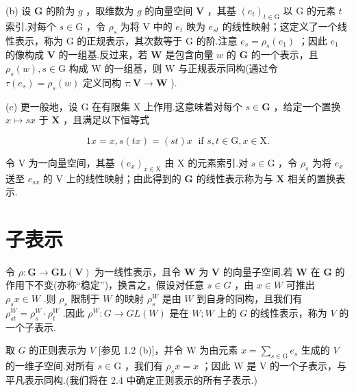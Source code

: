 (b) 设 \(\mathbf{G}\) 的阶为 \(g\) ，取维数为 \(g\) 的向量空间 \(\mathbf{V}\) ，其基 \({\left( {e}_{t}\right) }_{t \in  \mathrm{G}}\) 以 \(\mathrm{G}\) 的元素 \(t\) 索引.对每个 \(s \in  \mathrm{G}\) ，令 \({\rho }_{s}\) 为将 \(\mathrm{V}\) 中的 \({e}_{t}\) 映为 \({e}_{st}\) 的线性映射；这定义了一个线性表示，称为 G 的正规表示，其次数等于 G 的阶.注意 \({e}_{s} = {\rho }_{s}\left( {e}_{1}\right)\) ；因此 \({e}_{1}\) 的像构成 \(\mathbf{V}\) 的一组基.反过来，若 \(\mathbf{W}\) 是包含向量 \(w\) 的 \(\mathbf{G}\) 的一个表示，且 \({\rho }_{s}\left( w\right) ,s \in  \mathrm{G}\) 构成 \(\mathrm{W}\) 的一组基，则 W 与正规表示同构(通过令 \(\tau \left( {e}_{s}\right)  = {\rho }_{s}\left( w\right)\) 定义同构 \(\tau  : \mathbf{V} \rightarrow  \mathbf{W}\) ).

(c) 更一般地，设 G 在有限集 X 上作用.这意味着对每个 \(s \in  \mathbf{G}\) ，给定一个置换 \(x \mapsto  {sx}\) 于 \(\mathbf{X}\) ，且满足以下恒等式

\[
{1x} = x,s\left( {tx}\right)  = \left( {st}\right) x\;\text{ if }s,t \in  \mathrm{G},x \in  \mathrm{X}.
\]

令 \(\mathrm{V}\) 为一向量空间，其基 \({\left( {e}_{x}\right) }_{x \in  \mathrm{X}}\) 由 X 的元素索引.对 \(s \in  \mathrm{G}\) ，令 \({\rho }_{s}\) 为将 \({e}_{x}\) 送至 \({e}_{sx}\) 的 \(\mathrm{V}\) 上的线性映射；由此得到的 \(\mathbf{G}\) 的线性表示称为与 \(\mathbf{X}\) 相关的置换表示.

\section{子表示}

令 \(\rho  : \mathbf{G} \rightarrow  \mathbf{{GL}}\left( \mathbf{V}\right)\) 为一线性表示，且令 \(\mathbf{W}\) 为 \(\mathbf{V}\) 的向量子空间.若 \(\mathbf{W}\) 在 \(\mathbf{G}\) 的作用下不变(亦称“稳定”)，换言之，假设对任意 \(s \in  G\) ，由 \(x \in  W\) 可推出 \({\rho }_{s}x \in  W\) .则 \({\rho }_{s}\) 限制于 \(W\) 的映射 \({\rho }_{s}^{W}\) 是由 \(W\) 到自身的同构，且我们有 \({\rho }_{st}^{W} = {\rho }_{s}^{W} \cdot  {\rho }_{t}^{W}\) .因此 \({\rho }^{W} : G \rightarrow  {GL}\left( W\right)\) 是在 \(W;W\) 上的 \(G\) 的线性表示，称为 \(V\) 的一个子表示.
\begin{instance}
取 \(G\) 的正则表示为 \(V\) [参见 1.2 (b)]，并令 W 为由元素 \(x = \mathop{\sum }\limits_{{s \in  \mathrm{G}}}{e}_{s}\) 生成的 \(V\) 的一维子空间.对所有 \(s \in  \mathrm{G}\) ，我们有 \({\rho }_{s}x = x\) ；因此 \(\mathrm{W}\) 是 \(\mathrm{V}\) 的一个子表示，与平凡表示同构.(我们将在 2.4 中确定正则表示的所有子表示.)
\end{instance}

